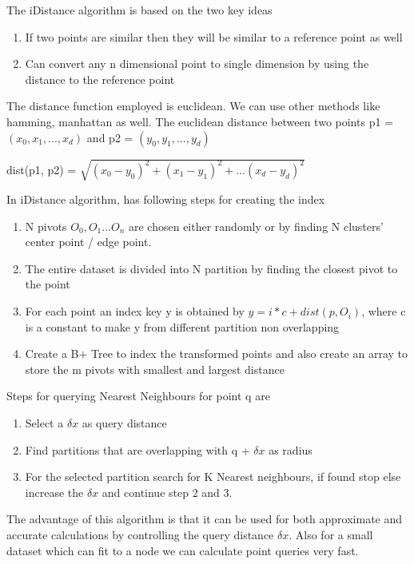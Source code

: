 \documentclass[conference]{IEEEtran}
\begin{document}
\bigskip
The iDistance algorithm is based on the two key ideas
\begin{enumerate}
\item If two points are similar then they will be similar to a
  reference point as well
\item Can convert any n dimensional point to single dimension by using
  the distance to the reference point
\end{enumerate}

\medskip

The distance function employed is euclidean. We can use other methods
like hamming, manhattan as well. The euclidean distance between two
points p1 = $(x_0, x_1, ... , x_d)$ and p2 = $(y_0, y_1, ..., y_d)$

\bigskip
dist(p1, p2) = $\sqrt{(x_0 - y_0)^2 + (x_1 - y_1)^2 + ... (x_d - y_d)^2}$
\bigskip

In iDistance algorithm, has following steps for creating the index
\begin{enumerate}
\item N pivots $O_0, O_1 ... O_n$ are chosen either randomly or by finding N clusters'
  center point / edge point.
\item The entire dataset is divided into N partition by finding the
  closest pivot to the point
\item For each point an index key y is obtained by
$y = i*c + dist(p, O_i)$, where c is a constant to make y from
different partition non overlapping
\item Create a B+ Tree to index the transformed points and also create
  an array to store the m pivots with smallest and largest distance
\end{enumerate}

\bigskip

Steps for querying Nearest Neighbours for point q are
\begin{enumerate}
\item Select a $\delta{x}$ as query distance
\item Find partitions that are overlapping with q + $\delta{x}$ as
  radius
\item For the selected partition search for K Nearest neighbours, if
  found stop else increase the $\delta{x}$ and continue step 2 and
  3.
\end{enumerate}

\bigskip
The advantage of this algorithm is that it can be used for both
approximate and accurate calculations by controlling the query
distance $\delta{x}$. Also for a small dataset which can fit to a node
we can calculate point queries very fast.
\end{document}
